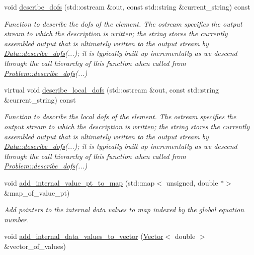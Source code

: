 \begin{DoxyCompactItemize}
void \hyperlink{classoomph_1_1GeneralisedElement_ad66a4deee43225439b62e20c18accea7}{describe\+\_\+dofs} (std\+::ostream \&out, const std\+::string \&current\+\_\+string) const
\begin{DoxyCompactList}\small\item\em Function to describe the dofs of the element. The ostream specifies the output stream to which the description is written; the string stores the currently assembled output that is ultimately written to the output stream by \hyperlink{classoomph_1_1Data_a2dae16e2dcff9a40029f834c83364df5}{Data\+::describe\+\_\+dofs}(...); it is typically built up incrementally as we descend through the call hierarchy of this function when called from \hyperlink{classoomph_1_1Problem_abc103804eb319ae0b3d43870cc3e1eaf}{Problem\+::describe\+\_\+dofs}(...) \end{DoxyCompactList}\item 
virtual void \hyperlink{classoomph_1_1GeneralisedElement_aa1a6edcb57e0d9c282b1e2bdca7a6e2a}{describe\+\_\+local\+\_\+dofs} (std\+::ostream \&out, const std\+::string \&current\+\_\+string) const
\begin{DoxyCompactList}\small\item\em Function to describe the local dofs of the element. The ostream specifies the output stream to which the description is written; the string stores the currently assembled output that is ultimately written to the output stream by \hyperlink{classoomph_1_1Data_a2dae16e2dcff9a40029f834c83364df5}{Data\+::describe\+\_\+dofs}(...); it is typically built up incrementally as we descend through the call hierarchy of this function when called from \hyperlink{classoomph_1_1Problem_abc103804eb319ae0b3d43870cc3e1eaf}{Problem\+::describe\+\_\+dofs}(...) \end{DoxyCompactList}\item 
void \hyperlink{classoomph_1_1GeneralisedElement_a21176c64836cffa50accdeb494a31d72}{add\+\_\+internal\+\_\+value\+\_\+pt\+\_\+to\+\_\+map} (std\+::map$<$ unsigned, double $\ast$$>$ \&map\+\_\+of\+\_\+value\+\_\+pt)
\begin{DoxyCompactList}\small\item\em Add pointers to the internal data values to map indexed by the global equation number. \end{DoxyCompactList}\item 
void \hyperlink{classoomph_1_1GeneralisedElement_a3f15bfeb2a705f8acfa529967077bc20}{add\+\_\+internal\+\_\+data\+\_\+values\+\_\+to\+\_\+vector} (\hyperlink{classoomph_1_1Vector}{Vector}$<$ double $>$ \&vector\+\_\+of\+\_\+values)
$$
\end{DoxyCompactItemize}
